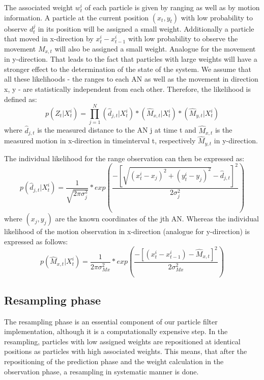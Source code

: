 The associated weight $w^{i}_{t}$ of each particle is given by ranging as well as by motion information. A particle at the current position $(x_{t},y_{t})$ with low probability to observe $d_{t}^{j}$ in its position will be assigned a small weight. Additionally a particle that moved in x-direction by $x_{t}^{i}-x_{t-1}^{i}$ with low probability to observe the movement $M_{x,t}$ will also be assigned a small weight. Analogue for the movement in y-direction.
That leads to the fact that particles with large weights will have a stronger effect to the determination of the state of the system.
We assume that all these likelihoods - the ranges to each AN as well as the movement in direction x, y - are statistically independent from each other. Therefore, the likelihood is defined as:
$$p(Z_{t} | X^{i}_{t}) = \prod_{j=1}^{N} (\hat{d}_{j,t}|X_{t}^{i}) * (\hat{M}_{x,t} | X^{i}_{t}) * (\hat{M}_{y,t} | X^{i}_{t})$$
where $\hat{d}_{j,t}$ is the measured distance to the AN j at time t and $\hat{M}_{x,t}$ is the measured motion in x-direction in timeinterval t, respectively $\hat{M}_{y,t}$ in y-direction.  

The individual likelihood for the range observation can then be expressed as:
$$p(\hat{d}_{j,t} | X^{i}_{t}) = \frac{1}{\sqrt{2\pi \sigma_{j}^{2}}} * exp(\frac{-[\sqrt{(x^{i}_{t}-x_{j})^{2}+(y^{i}_{t}-y_{j})^{2}} - \hat{d}_{j,t}]^{2}}{2\sigma_{j}^{2}})$$
where $(x_{j},y_{j})$ are the known coordinates of the jth AN.
Whereas the individual likelihood of the motion observation in x-direction (analogue for y-direction) is expressed as follows:
$$p(\hat{M}_{x,t} | X^{i}_{t}) = \frac{1}{2\pi \sigma_{Mx}^{2}} * exp(\frac{-[(x^{i}_{t}-x^{i}_{t-1}) - \hat{M}_{x,t}]^{2}}{2\sigma_{Mx}^{2}})$$

\subsection{Resampling phase}
The resampling phase is an essential component of our particle filter implementation, although it is a computationally expensive step. In the resampling, particles with low assigned weights are repositioned at identical positions as particles with high associated weights. This means, that after the repositioning of the prediction phase and the weight calculation in the observation phase, a resampling in systematic manner is done. 

